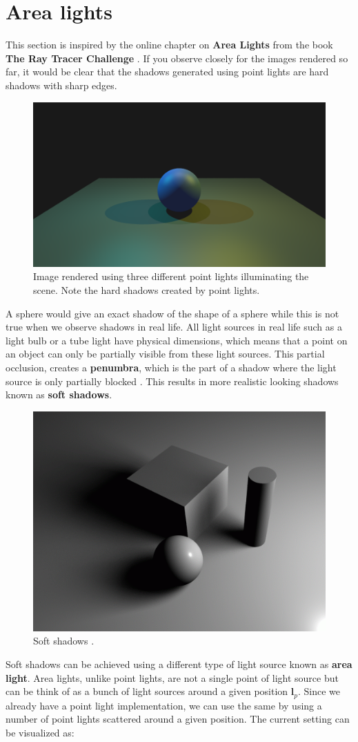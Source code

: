 \documentclass[11pt,a4paper]{article}
\begin{document}
	\section{Area lights}
	This section is inspired by the online chapter on \textbf{Area Lights} from the book \textbf{The Ray Tracer Challenge} \cite{TRTChallenge}.
	If you observe closely for the images rendered so far, it would be clear that the shadows generated using point lights are hard shadows with sharp edges. 
	\begin{figure}[H]
		\centering
		\captionsetup{justification=centering}
		\includegraphics[width=.4\textwidth]{point_light_hard_shadows}\quad
		\caption{Image rendered using three different point lights illuminating the scene. Note the hard shadows created by point lights.}
	\end{figure}
	\noindent
	A sphere would give an exact shadow of the shape of a sphere while this is not true when we observe shadows in real life. All light sources in real life such as a light bulb or a tube light have physical dimensions, which means that a point on an object can only be partially visible from these light sources. This partial occlusion, creates a \textbf{penumbra}, which is the part of a shadow where the light source is only partially blocked \cite{penumbra}. This results in more realistic looking shadows known as \textbf{soft shadows}.
	\begin{figure}[H]
		\centering
		\captionsetup{justification=centering}
		\includegraphics[width=.3\textwidth]{softshadows}\quad
		\caption{Soft shadows \protect\cite{christensen2018renderman}.}
	\end{figure}
	\noindent
	Soft shadows can be achieved using a different type of light source known as \textbf{area light}. Area lights, unlike point lights, are not a single point of light source but can be think of as a bunch of light sources around a given position $\boldsymbol{l}_{p}$. Since we already have a point light implementation, we can use the same by using a number of point lights scattered around a given position. The current setting can be visualized as:
\end{document}
